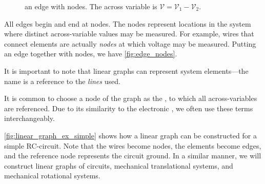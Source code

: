\documentclass[dynamic_systems.tex]{subfiles}
\begin{document}
\begin{wrapfigure}[7]{r}{0.4\textwidth}
  \centering
  \caption{\label{fig:edge_nodes} an edge with nodes. The across variable is $\mathcal{V} = \mathcal{V}_1 - \mathcal{V}_2$.}%
\end{wrapfigure}

All edges begin and end at nodes.
The nodes represent locations in the system where distinct across-variable values may be measured.
For example, wires that connect elements are actually \emph{nodes} at which voltage may be measured.
Putting an edge together with nodes, we have \autoref{fig:edge_nodes}.

It is important to note that linear graphs can represent  system elements---the name is a reference to the \emph{lines} used.
\tags{}

It is common to choose a node of the graph as the , to which all across-variables are referenced.
Due to its similarity to the electronic , we often use these terms interchangeably.
\tags{}

\autoref{fig:linear_graph_ex_simple} shows how a linear graph can be constructed for a simple RC-circuit.
Note that the wires become nodes, the elements become edges, and the reference node represents the circuit ground.
In a similar manner, we will construct linear graphs of circuits, mechanical translational systems, and mechanical rotational systems.
\end{document}
